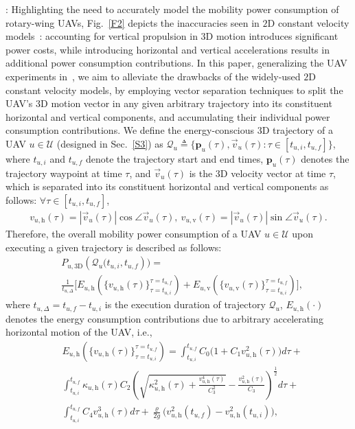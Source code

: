 \documentclass[10pt, twocolumn]{IEEEtran}
\newcommand{\abs}[1]{\left\lvert#1\right\rvert}
\begin{document}
: Highlighting the need to accurately model the mobility power consumption of rotary-wing UAVs, Fig.~\ref{F2} depicts the inaccuracies seen in $2$D constant velocity models~\cite{UAV_Propulsion_2, MAESTRO_TCCN}: accounting for vertical propulsion in $3$D motion introduces significant power costs, while introducing horizontal and vertical accelerations results in additional power consumption contributions. In this paper, generalizing the UAV experiments in~\cite{UAV_Propulsion_1}, we aim to alleviate the drawbacks of the widely-used $2$D constant velocity models, by employing vector separation techniques to split the UAV's $3$D motion vector in any given arbitrary trajectory into its constituent horizontal and vertical components, and accumulating their individual power consumption contributions. We define the energy-conscious $3$D trajectory of a UAV $u{\in}\mathcal{U}$ (designed in Sec.~\ref{S3}) as $\mathcal{Q}_{u}{\triangleq}\Big\{\mathbf{p}_{u}(\tau),\vec{v}_{u}(\tau): \tau{\in}\left[t_{u,i},t_{u,f}\right]\Big\}$, where $t_{u,i}$ and $t_{u,f}$ denote the trajectory start and end times, $\mathbf{p}_{u}(\tau)$ denotes the trajectory waypoint at time $\tau$, and $\vec{v}_{u}(\tau)$ is the $3$D velocity vector at time $\tau$, which is separated into its constituent horizontal and vertical components as follows: ${\forall}\tau{\in}\left[t_{u,i},t_{u,f}\right]$,
\begin{align*}
    v_{u,\mathrm{h}}(\tau){=}\abs{\vec{v}_{u}(\tau)}\cos{\angle{\vec{v}_{u}(\tau)}},\ v_{u,\mathrm{v}}(\tau){=}\abs{\vec{v}_{u}(\tau)}\sin{\angle{\vec{v}_{u}(\tau)}}.
\end{align*}
Therefore, the overall mobility power consumption of a UAV $u{\in}\mathcal{U}$ upon executing a given trajectory is described as follows:
\begin{align}\label{3D_power}
    &P_{u,3\mathrm{D}}\left(\mathcal{Q}_{u}\Big(t_{u,i},t_{u,f}\right)\Big) = \\&\frac{1}{t_{u,\Delta}}\Bigg[E_{u,\mathrm{h}}\left(\Big\{v_{u,\mathrm{h}}(\tau)\Big\}_{\tau{=}t_{u,i}}^{\tau{=}t_{u,f}}\right){+}E_{u,\mathrm{v}}\left(\Big\{v_{u,\mathrm{v}}(\tau)\Big\}_{\tau{=}t_{u,i}}^{\tau{=}t_{u,f}}\right)\Bigg],\nonumber
\end{align}
where $t_{u,\Delta}{=}t_{u,f}{-}t_{u,i}$ is the execution duration of trajectory $\mathcal{Q}_{u}$, $E_{u,\mathrm{h}}({\cdot})$ denotes the energy consumption contributions due to arbitrary accelerating horizontal motion of the UAV, i.e.,
\begin{align}\label{Horizontal_energy}
    &E_{u,\mathrm{h}}\left(\Big\{v_{u,\mathrm{h}}(\tau)\Big\}_{\tau{=}t_{u,i}}^{\tau{=}t_{u,f}}\right) = \int_{t_{u,i}}^{t_{u,f}}C_{0}\Big(1 + C_{1}v_{u,\mathrm{h}}^{2}(\tau)\Big)d\tau + \nonumber\\&\int_{t_{u,i}}^{t_{u,f}}\kappa_{u,\mathrm{h}}(\tau)C_{2}\left(\sqrt{\kappa_{u,\mathrm{h}}^{2}(\tau){+}\frac{v_{u,\mathrm{h}}^{4}(\tau)}{C_{3}^{2}}}{-}\frac{v_{u,\mathrm{h}}^{2}(\tau)}{C_{3}}\right)^{\frac{1}{2}}d\tau{+}\nonumber\\&\int_{t_{u,i}}^{t_{u,f}}C_{4}v_{u,\mathrm{h}}^{3}(\tau)d\tau + \frac{\varrho}{2g}\Big(v_{u,\mathrm{h}}^{2}(t_{u,f}) - v_{u,\mathrm{h}}^{2}(t_{u,i})\Big),
\end{align}
\end{document}
